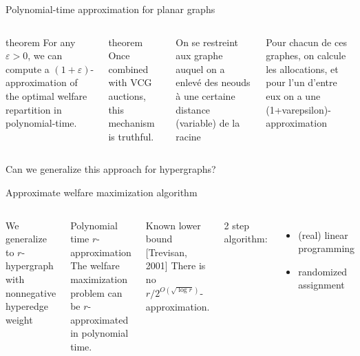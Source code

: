 \documentclass[aspectratio=169]{beamer}
\begin{document}
\begin{frame}{Polynomial-time approximation for planar graphs}
    \begin{columns}
        \begin{block}{theorem}
            For any $\varepsilon > 0$, we can compute a $(1 + \varepsilon)$-approximation of the optimal welfare repartition in polynomial-time.
        \end{block}

        \begin{block}{theorem}
            Once combined with VCG auctions, this mechanism is truthful.
        \end{block}

        On se restreint aux graphe auquel on a enlevé des neouds à une certaine distance (variable) de la racine

        Pour chacun de ces graphes, on calcule les allocations, et pour l'un d'entre eux on a une (1+varepsilon)-approximation


    \end{columns}
\end{frame}

\begin{frame}[standout]
    Can we generalize this approach for \alert{hypergraphs}?
\end{frame}

\begin{frame}{Approximate welfare maximization algorithm}
    \begin{columns}
        We generalize to \(r\)-hypergraph with \alert{nonnegative hyperedge weight}

        \begin{block}{Polynomial time \(r\)-approximation}
            The welfare maximization problem can be \(r\)-approximated in polynomial time.
        \end{block}

        \begin{block}{Known lower bound [Trevisan, 2001]}
            There is no \(r/2^{O(\sqrt{\log r})}\)-approximation.
        \end{block}

        2 step algorithm:
        \begin{itemize}
            \item (real) linear programming
            \item randomized assignment
        \end{itemize}
    \end{columns}
\end{frame}
\end{document}
